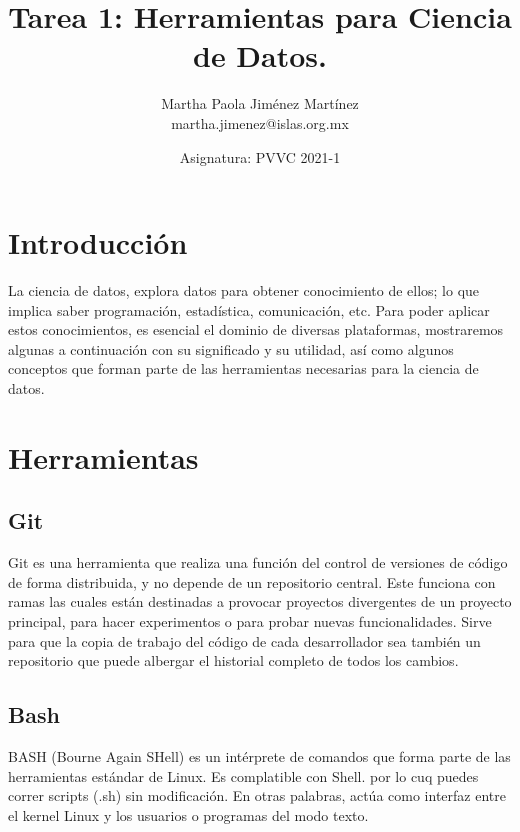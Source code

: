 \documentclass[12pt,letterpaper]{article}
\begin{document}
\title{\textbf{Tarea 1: Herramientas para Ciencia de Datos.}} \author{Martha Paola Jiménez
Martínez \\
\small{martha.jimenez@islas.org.mx}}
\date{ \small{Asignatura: PVVC 2021-1}
} 
\maketitle


\section*{Introducción}
La ciencia de datos, explora datos para obtener conocimiento de ellos; lo que implica saber programación, estadística, comunicación, etc. Para poder aplicar estos conocimientos, es esencial el dominio de diversas plataformas, mostraremos algunas a continuación con su significado y su utilidad, así como algunos conceptos que forman parte de las herramientas necesarias para la ciencia de datos.

\section*{Herramientas}
\subsection*{Git}
Git es una herramienta que realiza una función del control de versiones de
código de forma distribuida, y no depende de un repositorio central. Este
funciona con ramas las cuales están destinadas a provocar proyectos divergentes
de un proyecto principal, para hacer experimentos o para probar nuevas
funcionalidades.
\citep{rubio_2020}
Sirve para que la copia de trabajo del código de cada desarrollador sea también
un repositorio que puede albergar el historial completo de todos los cambios.
\citep{bitbucket_git}

\subsection*{Bash}
BASH (Bourne Again SHell) es un intérprete de comandos que forma parte de las herramientas estándar de Linux. Es complatible con Shell. por lo cuq puedes correr scripts (.sh) sin modificación. En otras palabras, actúa como interfaz entre el kernel Linux y los usuarios o programas del modo texto.
\citep{canepa_2018}
\end{document}
